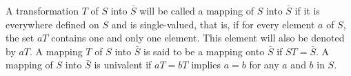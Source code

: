 A transformation $T$ of $S$ into $\bar{S}$ will be called a mapping of $S$ into $\bar{S}$ if it is everywhere defined on $S$ and is single-valued, that is, if for every element $a$ of $S$, the set $aT$ contains one and only one element. This element will also be denoted by $aT$. A mapping $T$ of $S$ into $\bar{S}$ is said to be a mapping onto $\bar{S}$ if $ST = \bar{S}$. A mapping of $S$ into $\bar{S}$ is univalent if $aT = bT$ implies $a = b$ for any $a$ and $b$ in $S$.
